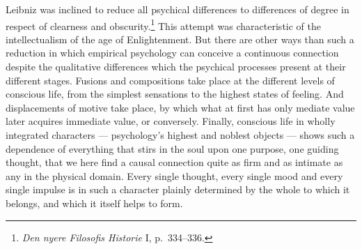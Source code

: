 \documentclass[12pt,a4paper]{book}
\begin{document}
Leibniz was inclined to reduce all psychical differences to differences of
degree in respect of clearness and obscurity.\footnote{\textit{Den nyere
Filosofis Historie} I, p.~334--336.} This attempt was characteristic of the
intellectualism of the age of Enlightenment. But there are other ways than such
a reduction in which empirical psychology can conceive a continuous connection
despite the qualitative differences which the psychical processes present at
their different stages. Fusions and compositions take place at the different
levels of conscious life, from the simplest sensations to the highest states of
feeling. And displacements of motive take place, by which what at first has only
mediate value later acquires immediate value, or conversely. Finally, conscious
life in wholly integrated characters --- psychology's highest and noblest
objects --- shows such a dependence of everything that stirs in the soul upon
one purpose, one guiding thought, that we here find a causal connection quite as
firm and as intimate as any in the physical domain. Every single thought, every
single mood and every single impulse is in such a character plainly determined
by the whole to which it belongs, and which it itself helps to form.
\end{document}

